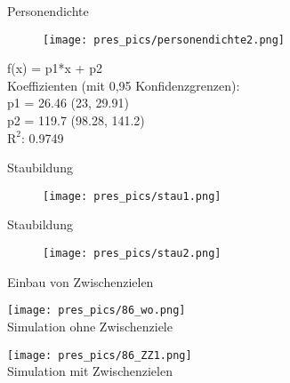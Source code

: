 \begin{frame}{Personendichte}

	\begin{figure}
		\texttt{[image: pres\_pics/personendichte2.png]}\\
	\end{figure}

		\begin{center}
		\begin{tiny}
		   f(x) = p1*x + p2\\
			Koeffizienten (mit 0,95 Konfidenzgrenzen):\\
    	  	p1 = 26.46  (23, 29.91)\\
     		p2 = 119.7  (98.28, 141.2)\\
     		$\text{R}^2$: 0.9749
		\end{tiny}
	\end{center}

\end{frame}



\begin{frame}{Staubildung}

	\begin{figure}
		\texttt{[image: pres\_pics/stau1.png]}\\

	\end{figure}

\end{frame}

\begin{frame}{Staubildung}

	\begin{figure}
		\texttt{[image: pres\_pics/stau2.png]}\\

	\end{figure}

\end{frame}



\begin{frame}{Einbau von Zwischenzielen}


	\begin{minipage}{0.48\textwidth}
		\texttt{[image: pres\_pics/86\_wo.png]}\\
		Simulation ohne Zwischenziele

	\end{minipage} \hfill
	\begin{minipage}{0.48\textwidth}
		\texttt{[image: pres\_pics/86\_ZZ1.png]}\\
		Simulation mit Zwischenzielen

\end{minipage}

\end{frame}



